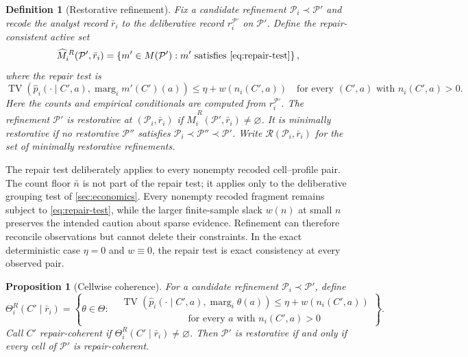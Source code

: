 \documentclass[11pt]{article}
\newtheorem{definition}[assumption]{Definition}
\newtheorem{proposition}[assumption]{Proposition}
\theoremstyle{definition}
\newcommand{\emptysetset}{\varnothing}
\newcommand{\TV}{\operatorname{TV}}
\newcommand{\marg}[1]{\operatorname{marg}_{#1}}
\begin{document}
\begin{definition}[Restorative refinement]
\label{def:restorative}
Fix a candidate refinement $\mathcal P_i\prec\mathcal P'$ and recode the analyst record $\bar r_i$ to the deliberative record $r_i^{\mathcal P'}$ on $\mathcal P'$.
Define the \emph{repair-consistent active set}
\[
\widehat M_i^{\,R}(\mathcal P',\bar r_i)
=
\left\{
m'\in M(\mathcal P'):
m'\text{ satisfies \cref{eq:repair-test}}
\right\},
\]
where the \emph{repair test} is
\begin{equation}
\TV\!\left(
\hat p_i(\cdot\mid C',a),
\marg{i}m'(C')(a)
\right)
\leq
\eta+w\!\left(n_i(C',a)\right)
\quad
\text{for every $(C',a)$ with }n_i(C',a)>0.
\label{eq:repair-test}
\end{equation}
Here the counts and empirical conditionals are computed from $r_i^{\mathcal P'}$.
The refinement $\mathcal P'$ is \emph{restorative} at $(\mathcal P_i,\bar r_i)$ if $\widehat M_i^{\,R}(\mathcal P',\bar r_i)\neq\emptysetset$.
It is \emph{minimally restorative} if no restorative $\mathcal P''$ satisfies $\mathcal P_i\prec\mathcal P''\prec\mathcal P'$.
Write $\mathcal R(\mathcal P_i,\bar r_i)$ for the set of minimally restorative refinements.
\end{definition}

The repair test deliberately applies to every nonempty recoded cell--profile pair.
The count floor $\bar n$ is not part of the repair test; it applies only to the deliberative grouping test of \cref{sec:economics}.
Every nonempty recoded fragment remains subject to \cref{eq:repair-test}, while the larger finite-sample slack $w(n)$ at small $n$ preserves the intended caution about sparse evidence.
Refinement can therefore reconcile observations but cannot delete their constraints.
In the exact deterministic case $\eta=0$ and $w\equiv0$, the repair test is exact consistency at every observed pair.

\begin{proposition}[Cellwise coherence]
\label{prop:coherence}
For a candidate refinement $\mathcal P_i\prec\mathcal P'$, define
\[
\Theta_i^{R}(C'\mid\bar r_i)
=
\left\{
\theta\in\Theta:
\begin{aligned}
&\TV\!\left(
  \hat p_i(\cdot\mid C',a),\marg{i}\theta(a)
 \right)
 \leq \eta+w\!\left(n_i(C',a)\right)\\[-0.2em]
&\hspace{7em}\text{for every $a$ with }n_i(C',a)>0
\end{aligned}
\right\}.
\]
Call $C'$ \emph{repair-coherent} if $\Theta_i^{R}(C'\mid\bar r_i)\neq\emptysetset$.
Then $\mathcal P'$ is restorative if and only if every cell of $\mathcal P'$ is repair-coherent.
\end{proposition}
\end{document}
